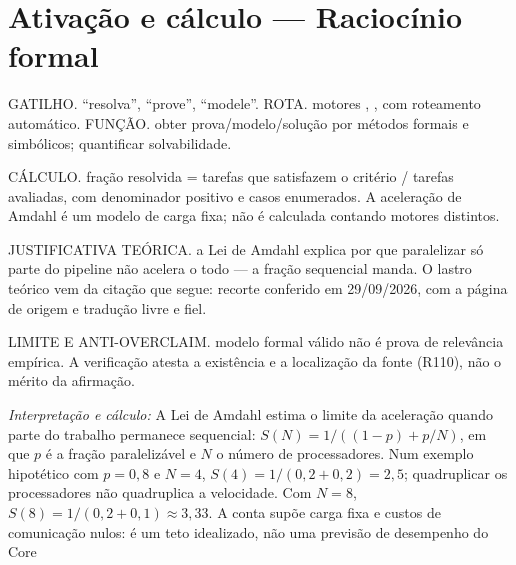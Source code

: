 \section[Ativação e cálculo]{Ativação e cálculo — Raciocínio formal}

\begin{processo}
GATILHO. ``resolva'', ``prove'', ``modele''.
ROTA. motores , ,  com roteamento automático.
FUNÇÃO. obter prova/modelo/solução por métodos formais e simbólicos; quantificar solvabilidade.
\end{processo}

\begin{resultado}
CÁLCULO. fração resolvida = tarefas que satisfazem o critério / tarefas
avaliadas, com denominador positivo e casos enumerados. A aceleração de
Amdahl é um modelo de carga fixa; não é calculada contando motores distintos.
\end{resultado}

\begin{descricao}
JUSTIFICATIVA TEÓRICA. a Lei de Amdahl explica por que paralelizar só parte do pipeline não acelera o todo — a fração sequencial manda. O lastro teórico vem da citação que segue: recorte conferido em 29/09/2026, com a página de origem e tradução livre e fiel.
\end{descricao}

\begin{aviso}
LIMITE E ANTI-OVERCLAIM. modelo formal válido não é prova de relevância empírica. A verificação atesta a existência e a
localização da fonte (R110), não o mérito da afirmação.
\end{aviso}

\noindent\textit{Interpretação e cálculo:} A Lei de Amdahl estima o limite da aceleração quando parte do trabalho permanece sequencial: $S(N)=1/((1-p)+p/N)$, em que $p$ é a fração paralelizável e $N$ o número de processadores. Num exemplo hipotético com $p=0{,}8$ e $N=4$, $S(4)=1/(0{,}2+0{,}2)=2{,}5$; quadruplicar os processadores não quadruplica a velocidade. Com $N=8$, $S(8)=1/(0{,}2+0{,}1)\approx3{,}33$. A conta supõe carga fixa e custos de comunicação nulos: é um teto idealizado, não uma previsão de desempenho do Core 

